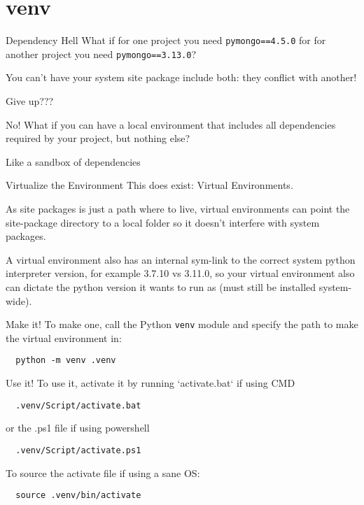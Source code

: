 \section{venv}
\begin{frame}[containsverbatim]{Dependency Hell}
  What if for one project you need \verb|pymongo==4.5.0| for for another project you need \verb|pymongo==3.13.0|?

  You can't have your system site package include both: they conflict with another! \pause

  Give up???
\end{frame}

\begin{frame}{No!}
  What if you can have a local environment that includes all dependencies required by your project, but nothing else?

  Like a sandbox of dependencies
\end{frame}

\begin{frame}{Virtualize the Environment}
  This does exist: Virtual Environments.

  As site packages is just a path where to live, virtual environments can point the site-package directory to a local folder so it doesn't interfere with system packages.

  A virtual environment also has an internal sym-link to the correct system python interpreter version, for example 3.7.10 vs 3.11.0, so your virtual environment also can dictate the python version it wants to run as (must still be installed system-wide).
\end{frame}

\begin{frame}[containsverbatim]{Make it!}
  To make one, call the Python \verb|venv| module and specify the path to make the virtual environment in:
  \begin{verbatim}
  python -m venv .venv
  \end{verbatim}
\end{frame}

\begin{frame}[containsverbatim]{Use it!}
  To use it, activate it by running `activate.bat` if using CMD
  \begin{verbatim}
  .venv/Script/activate.bat
  \end{verbatim}

  or the .ps1 file if using powershell
  \begin{verbatim}
  .venv/Script/activate.ps1
  \end{verbatim}

  To source the activate file if using a sane OS:
  \begin{verbatim}
  source .venv/bin/activate
  \end{verbatim}
\end{frame}

